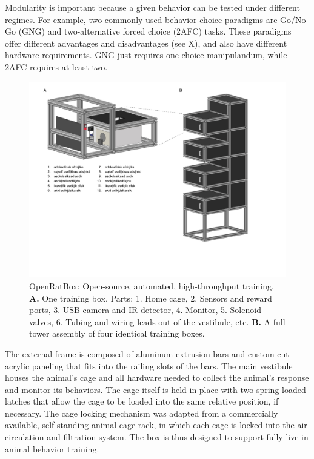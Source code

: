 Modularity is important because a given behavior can be tested under different regimes. For example, two commonly used behavior choice paradigms are Go/No-Go (GNG) and two-alternative forced choice (2AFC) tasks. These paradigms offer different advantages and disadvantages (see X), and also have different hardware requirements. GNG just requires one choice manipulandum, while 2AFC requires at least two.

\begin{figure}[t!]
    \includegraphics[width=\textwidth]{figures/chapter_1/fig_1-1_openratbox/openratbox.pdf}
    \vspace{.1in}
    \caption[OpenRatBox]{OpenRatBox: Open-source, automated, high-throughput training. \textbf{A.} One training box. Parts: 1. Home cage, 2. Sensors and reward ports, 3. USB camera and IR detector, 4. Monitor, 5. Solenoid valves, 6. Tubing and wiring leads out of the vestibule, etc. \textbf{B.} A full tower assembly of four identical training boxes. 
    \label{fig:openratbox}}
\end{figure}

The external frame is composed of aluminum extrusion bars and custom-cut acrylic paneling that fits into the railing slots of the bars. The main vestibule houses the animal's cage and all hardware needed to collect the animal's response and monitor its behaviors. The cage itself is held in place with two spring-loaded latches that allow the cage to be loaded into the same relative position, if necessary. The cage locking mechanism was adapted from a commercially available, self-standing animal cage rack, in which each cage is locked into the air circulation and filtration system. The box is thus designed to support fully live-in animal behavior training. 


